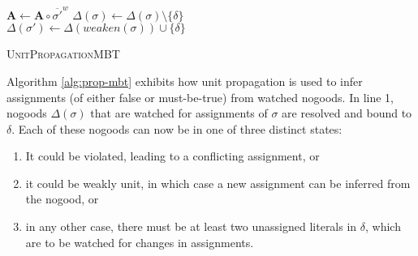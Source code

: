 \documentclass{vutinfth} %
\theoremstyle{example}
\theoremstyle{definition}
\theoremstyle{theorem}
\theoremstyle{lemma}
\theoremstyle{corollary}
\newcommand{\mbt}{must-be-true}
\newcommand{\negweak}[1]{\overline{#1}^w}
\newcommand{\wkn}{\textit{weaken}}
\begin{document}
\begin{algorithm}
  \ForEach{$\delta \in \Delta(\sigma)$}
  {
    {
    }
    {
      $\mathbf{A} \leftarrow \mathbf{A} \circ \negweak{\sigma'}$
    }
    \Else%
    {
      $\Delta(\sigma) \leftarrow \Delta(\sigma) \setminus \{ \delta \}$\\
      {
        $\Delta(\sigma') \leftarrow \Delta(\wkn(\sigma)) \cup \{ \delta \}$\\
      }
    }
  }
  \caption{\textsc{UnitPropagationMBT}}
  \label{alg:prop-mbt}
\end{algorithm}

Algorithm \ref{alg:prop-mbt} exhibits how unit propagation is used to infer assignments (of either false or \mbt) from watched nogoods. 
In line 1, nogoods $\Delta(\sigma)$ that are watched for assignments of $\sigma$ are resolved and bound to $\delta$. Each of these nogoods can now be in one of three distinct states:
\begin{enumerate}
\item It could be violated, leading to a conflicting assignment, or
\item it could be weakly unit, in which case a new assignment can be inferred from the nogood, or
\item in any other case, there must be at least two unassigned literals in $\delta$, which are to be watched for changes in assignments.
\end{enumerate}
\end{document}
